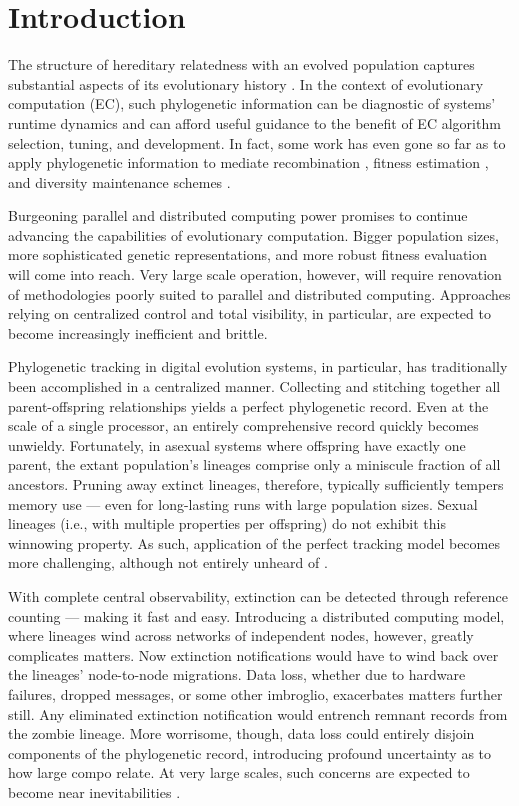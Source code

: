\section{Introduction} \label{sec:introduction}

The structure of hereditary relatedness with an evolved population captures substantial aspects of its evolutionary history \citep{dolson2019modes}.
In the context of evolutionary computation (EC), such phylogenetic information can be diagnostic of systems' runtime dynamics and can afford useful guidance to the benefit of EC algorithm selection, tuning, and development.
In fact, some work has even gone so far as to apply phylogenetic information to mediate recombination \citep{stanley2002evolving}, fitness estimation \citep{lalejini2023phylogeny}, and diversity maintenance schemes \citep{burke2003increased,murphy2008simple}.

Burgeoning parallel and distributed computing power promises to continue advancing the capabilities of evolutionary computation.
Bigger population sizes, more sophisticated genetic representations, and more robust fitness evaluation will come into reach.
Very large scale operation, however, will require renovation of methodologies poorly suited to parallel and distributed computing.
Approaches relying on centralized control and total visibility, in particular, are expected to become increasingly inefficient and brittle.

Phylogenetic tracking in digital evolution systems, in particular, has traditionally been accomplished in a centralized manner.
Collecting and stitching together all parent-offspring relationships yields a perfect phylogenetic record.
Even at the scale of a single processor, an entirely comprehensive record quickly becomes unwieldy.
Fortunately, in asexual systems where offspring have exactly one parent, the extant population's lineages comprise only a miniscule fraction of all ancestors.
Pruning away extinct lineages, therefore, typically sufficiently tempers memory use --- even for long-lasting runs with large population sizes.
Sexual lineages (i.e., with multiple properties per offspring) do not exhibit this winnowing property.
As such, application of the perfect tracking model becomes more challenging, although not entirely unheard of \citep{mcphee2018detailed,mcphee2016using,burlacu2013visualization}.

With complete central observability, extinction can be detected through reference counting --- making it fast and easy.
Introducing a distributed computing model, where lineages wind across networks of independent nodes, however, greatly complicates matters.
Now extinction notifications would have to wind back over the lineages' node-to-node migrations.
Data loss, whether due to hardware failures, dropped messages, or some other imbroglio, exacerbates matters further still.
Any eliminated extinction notification would entrench remnant records from the zombie lineage.
More worrisome, though, data loss could entirely disjoin components of the phylogenetic record, introducing profound uncertainty as to how large compo relate.
At very large scales, such concerns are expected to become near inevitabilities \citep{gropp2013programming}.

